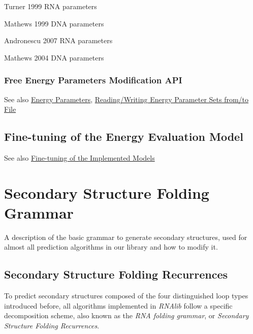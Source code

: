 \begin{DoxyItemize}
\item Turner 1999 R\+NA parameters
\item Mathews 1999 D\+NA parameters
\item Andronescu 2007 R\+NA parameters
\item Mathews 2004 D\+NA parameters
\end{DoxyItemize}\hypertarget{energy_evaluation_sec_energy_parameters_api}{}\subsubsection{Free Energy Parameters Modification A\+PI}\label{energy_evaluation_sec_energy_parameters_api}
\begin{DoxySeeAlso}{See also}
\hyperlink{group__energy__parameters}{Energy Parameters}, \hyperlink{group__energy__parameters__rw}{Reading/\+Writing Energy Parameter Sets from/to File}
\end{DoxySeeAlso}
\hypertarget{energy_evaluation_sec_model_details}{}\subsection{Fine-\/tuning of the Energy Evaluation Model}\label{energy_evaluation_sec_model_details}
\begin{DoxySeeAlso}{See also}
\hyperlink{group__model__details}{Fine-\/tuning of the Implemented Models}
\end{DoxySeeAlso}
 \hypertarget{folding_grammar}{}\section{Secondary Structure Folding Grammar}\label{folding_grammar}
A description of the basic grammar to generate secondary structures, used for almost all prediction algorithms in our library and how to modify it.\hypertarget{folding_grammar_sec_recursions}{}\subsection{Secondary Structure Folding Recurrences}\label{folding_grammar_sec_recursions}
To predict secondary structures composed of the four distinguished loop types introduced before, all algorithms implemented in {\itshape R\+N\+Alib} follow a specific decomposition scheme, also known as the {\itshape R\+NA folding grammar}, or {\itshape Secondary Structure Folding Recurrences}.

